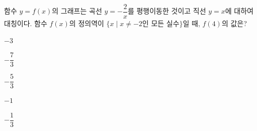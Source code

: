 \hspace*{2mm}\begin{minipage}[t]{\dimexpr\linewidth-2mm\relax}\vspace{0pt}
함수 $y=f(x)$의 그래프는 곡선 $y=-\dfrac{2}{x}$를 평행이동한 것이고 직선 $y=x$에 대하여 대칭이다. 함수 $f(x)$의 정의역이 $\{x \mid x\ne -2$인 모든 실수$\}$일 때, $f(4)$의 값은?
\begin{choices32}{\rule[-3ex]{0pt}{8ex}$-3$}{\rule[-3ex]{0pt}{8ex}$-\dfrac{7}{3}$}{\rule[-3ex]{0pt}{8ex}$-\dfrac{5}{3}$}{\rule[-3ex]{0pt}{8ex}$-1$}{\rule[-3ex]{0pt}{8ex}$-\dfrac{1}{3}$}\end{choices32}\end{minipage}
